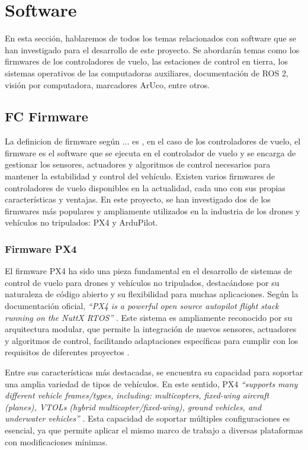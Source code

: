 
\section{Software}
En esta sección, hablaremos de todos los temas relacionados con software que se han investigado para el desarrollo de este proyecto. Se abordarán temas como los firmwares de los controladores de vuelo, las estaciones de control en tierra, los sistemas operativos de las computadoras auxiliares, documentación de ROS 2, visión por computadora, marcadores ArUco, entre otros.

\subsection{FC Firmware}
    La definicion de firmware según ... es \textit{} \cite{}, en el caso de los controladores de vuelo, el firmware es el software que se ejecuta en el controlador de vuelo y se encarga de gestionar los sensores, actuadores y algoritmos de control necesarios para mantener la estabilidad y control del vehículo. Existen varios firmwares de controladores de vuelo disponibles en la actualidad, cada uno con sus propias características y ventajas. En este proyecto, se han investigado dos de los firmwares más populares y ampliamente utilizados en la industria de los drones y vehículos no tripulados: PX4 y ArduPilot.
    \subsubsection{Firmware PX4}
    El firmware PX4 ha sido una pieza fundamental en el desarrollo de sistemas de control de vuelo para drones y vehículos no tripulados, destacándose por su naturaleza de código abierto y su flexibilidad para muchas aplicaciones. Según la documentación oficial, \textit{``PX4 is a powerful open source autopilot flight stack running on the NuttX RTOS''} \cite{px4_docs}. Este sistema es ampliamente reconocido por su arquitectura modular, que permite la integración de nuevos sensores, actuadores y algoritmos de control, facilitando adaptaciones específicas para cumplir con los requisitos de diferentes proyectos \cite{px4_docs}.

    Entre sus características más destacadas, se encuentra su capacidad para soportar una amplia variedad de tipos de vehículos. En este sentido, PX4 \textit{``supports many different vehicle frames/types, including: multicopters, fixed-wing aircraft (planes), VTOLs (hybrid multicopter/fixed-wing), ground vehicles, and underwater vehicles''} \cite{px4_docs}. Esta capacidad de soportar múltiples configuraciones es esencial, ya que permite aplicar el mismo marco de trabajo a diversas plataformas con modificaciones mínimas.

